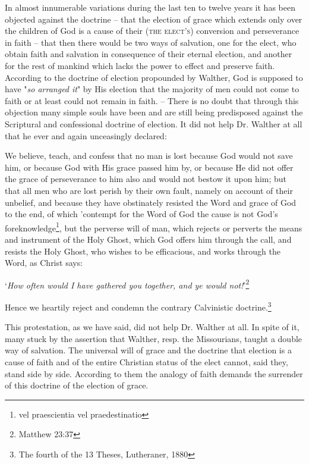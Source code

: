 In almost innumerable variations during the last ten to twelve years it has been objected against the doctrine – that the election of grace which extends only over the children of God is a cause of their {\scriptsize\textsc{(the elect's)}} conversion and perseverance in faith – that then there would be two ways of salvation, one for the elect, who obtain faith and salvation in consequence of their eternal election, and another for the rest of mankind which lacks the power to effect and preserve faith. According to the doctrine of election propounded by Walther, God is supposed to have "\textit{so arranged it}" by His election that the majority of men could not come to faith or at least could not remain in faith. – There is no doubt that through this objection many simple souls have been and are still being predisposed against the Scriptural and confessional doctrine of election. It did not help Dr. Walther at all that he ever and again unceasingly declared: \begin{fancyquotes}We believe, teach, and confess that no man is lost because God would not save him, or because God with His grace passed him by, or because He did not offer the grace of perseverance to him also and would not bestow it upon him; but that all men who are lost perish by their own fault, namely on account of their unbelief, and because they have obstinately resisted the Word and grace of God to the end, of which 'contempt for the Word of God the cause is not God's foreknowledge\footnote{vel praescientia vel praedestinatio}, but the perverse will of man, which rejects or perverts the means and instrument of the Holy Ghost, which God offers him through the call, and resists the Holy Ghost, who wishes to be efficacious, and works through the Word, as Christ says: \begin{displayquote}`\textit{How often would I have gathered you together, and ye would not!}'\footnote{Matthew 23:37}\end{displayquote} Hence we heartily reject and condemn the contrary Calvinistic doctrine.\footnote{The fourth of the 13 Theses, Lutheraner, 1880}\end{fancyquotes}  This protestation, as we have said, did not help Dr. Walther at all. In spite of it, many stuck by the assertion that Walther, resp. the Missourians, taught a double way of salvation. The universal will of grace and the doctrine that election is a cause of faith and of the entire Christian status of the elect cannot, said they, stand side by side. According to them the analogy of faith demands the surrender of this doctrine of the election of grace.

